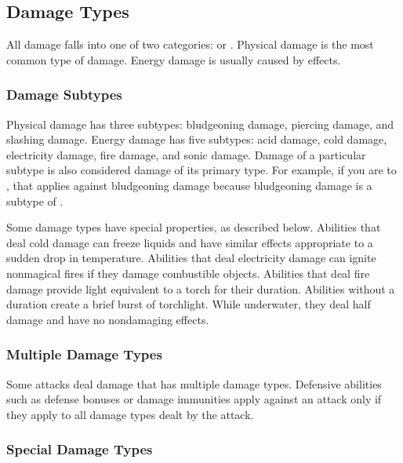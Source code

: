     \subsection{Damage Types}\label{Damage Types}
        All damage falls into one of two categories:  or .
        Physical damage is the most common type of damage.
        Energy damage is usually caused by  effects.

        \subsubsection{Damage Subtypes}\label{Damage Subtypes}
            Physical damage has three subtypes: bludgeoning damage, piercing damage, and slashing damage.
            Energy damage has five subtypes: acid damage, cold damage, electricity damage, fire damage, and sonic damage.
            Damage of a particular subtype is also considered damage of its primary type.
            For example, if you are  to , that applies against bludgeoning damage because bludgeoning damage is a subtype of .

            Some damage types have special properties, as described below.
             Abilities that deal cold damage can freeze liquids and have similar effects appropriate to a sudden drop in temperature.
             Abilities that deal electricity damage can ignite nonmagical fires if they damage combustible objects.
             Abilities that deal fire damage provide light equivalent to a torch for their duration.
            Abilities without a duration create a brief burst of torchlight.
            While underwater, they deal half damage and have no nondamaging effects.

        \subsubsection{Multiple Damage Types}\label{Multiple Damage Types}
            Some attacks deal damage that has multiple damage types.
            Defensive abilities such as defense bonuses or damage immunities apply against an attack only if they apply to all damage types dealt by the attack.

    \subsubsection{Special Damage Types}\label{Special Damage Types}

